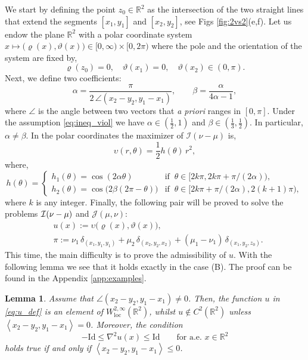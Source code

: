 \documentclass[11pt,letterpaper,reqno]{amsart}
\newtheorem{lemma}[theorem]{Lemma}
\theoremstyle{definition}
\numberwithin{equation}{section}
\newcommand{\R}{\mathbb{R}}
\newcommand{\pairing}[1]{{\left \langle #1 \right \rangle}}
\begin{document}
{We start by defining the point $z_0 \in \R^2$ as the intersection of the two straight lines that extend the segments $[x_1,y_1]$ and $[x_2,y_2]$, see Figs \ref{fig:2vs2}(e,f). Let us endow the plane $\R^2$ with a polar coordinate system $x \mapsto \big(\varrho(x), \vartheta(x)\big) \in [0,\infty) \times [0,2\pi)$
where the pole  and the orientation of the system are fixed by,
\begin{equation*}
	\varrho(z_0) = 0, \quad  \vartheta(x_1) = 0, \quad \vartheta(x_2) \in (0,\pi).
\end{equation*}
Next, we define two coefficients:
\begin{equation*}
	\alpha = \frac{\pi}{ 2 \, \angle(x_2-y_2,y_1-x_1)}, \qquad \beta = \frac{\alpha}{4\alpha-1},
\end{equation*}
where $\angle$ is the angle between two vectors that \textit{a priori} ranges in $[0,\pi]$.
Under the assumption \eqref{eq:ineq_viol} we have $\alpha \in (\frac{1}{2},1)$ and $\beta \in (\frac{1}{3},\frac{1}{2})$. In particular, $\alpha \neq \beta$. In the polar coordinates the maximizer of $\mathcal{I}(\nu-\mu)$ is,
\begin{equation*}
	{\upsilon}(r,\theta) = \frac{1}{2}  h(\theta) \, r^2,
\end{equation*}
where,
\begin{equation*}
	h(\theta) = \begin{cases}
		h_1(\theta)=\cos(2\alpha \theta) & \text{if } \ \theta \in \big[2k \pi, 2k \pi + \pi/(2\alpha) \big),\\
		h_2(\theta) = \cos\big(2\beta (2\pi - \theta) \big) & \text{if } \ \theta \in \big[2k \pi + \pi/(2\alpha) , 2(k+1) \pi \big),
	\end{cases} 
\end{equation*}
where $k$ is any integer.
Finally, the following pair will be proved to solve the problems  $\mathcal{I}(\nu- \nolinebreak \mu)$ and $\mathcal{J}(\mu,\nu)$:
\begin{subequations}
	\label{eq:u_def}
	\begin{align}
		&u(x) := \upsilon\big( \varrho(x), \vartheta(x) \big), \\
		&\pi:= \nu_1 \, \delta_{(x_1,y_1,y_1)} + \mu_2 \, \delta_{(x_2,y_2,x_2)} +(\mu_1 - \nu_1) \, \delta_{(x_1,y_2,z_0)}.
	\end{align}
\end{subequations}
This time, the main difficulty  is to prove the admissibility of $u$. With the following lemma we see that it holds exactly in the case (B). The proof can be found in the Appendix \ref{app:examples}.
\begin{lemma}
	\label{lem:u} Assume that $\angle(x_2-y_2,y_1-x_1) \neq 0$. Then, the function $u$ in \eqref{eq:u_def} is an element of
	$ W^{2,\infty}_{\mathrm{loc}}(\R^2)$, whilst $u \notin C^2(\R^2)$ unless $\pairing{x_2-y_2,y_1-x_1}  = 0$.
	Moreover, the condition 
	\begin{equation*}
		-\mathrm{Id} \leq \nabla^2 u(x) \leq \mathrm{Id} \qquad \text{for a.e. $x \in \R^2$}
	\end{equation*}
	holds true if and only if $\pairing{x_2-y_2,y_1-x_1}  \leq 0$.
\end{lemma}

}
\end{document}
